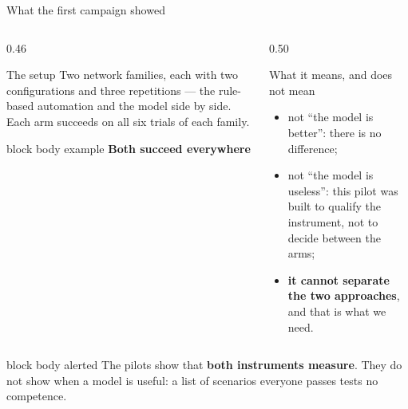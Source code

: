 \documentclass[aspectratio=169,10pt]{beamer}
\newcommand{\keymessage}[1]{%
  \begin{beamercolorbox}[rounded=true,sep=1.1ex,wd=\linewidth]{block body example}
    \centering\bfseries #1
  \end{beamercolorbox}
}
\begin{document}
\begin{frame}{What the first campaign showed}

  \begin{columns}[T,onlytextwidth]
    \begin{column}{0.46\textwidth}
      \begin{block}{The setup}
        \small Two network families, each with two configurations and three
        repetitions --- the rule-based automation and the model side by side.
        Each arm succeeds on all six trials of each family.
      \end{block}
      \keymessage{Both succeed everywhere}
    \end{column}
    \begin{column}{0.50\textwidth}
      \begin{alertblock}{What it means, and does not mean}
        \small
        \begin{itemize}
          \item not ``the model is better'': there is no difference;
          \item not ``the model is useless'': this pilot was built to qualify
                the instrument, not to decide between the arms;
          \item \textbf{it cannot separate the two approaches}, and that is
                what we need.
        \end{itemize}
      \end{alertblock}
    \end{column}
  \end{columns}

  \vspace{0.8em}
  \begin{beamercolorbox}[rounded=true,sep=1.2ex,wd=\linewidth]{block body alerted}
    \small The pilots show that \textbf{both instruments measure}. They do not
    show when a model is useful: a list of scenarios everyone passes tests no
    competence.
  \end{beamercolorbox}

\end{frame}
\end{document}
